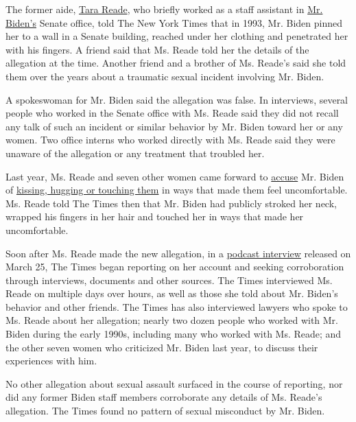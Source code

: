 The former aide,
\href{https://www.nytimes3xbfgragh.onion/2020/05/21/us/politics/tara-reade-credentials.html}{Tara
Reade}, who briefly worked as a staff assistant in
\href{https://www.nytimes3xbfgragh.onion/2020/04/16/technology/joe-biden-internet.html}{Mr.
Biden's} Senate office, told The New York Times that in 1993, Mr. Biden
pinned her to a wall in a Senate building, reached under her clothing
and penetrated her with his fingers. A friend said that Ms. Reade told
her the details of the allegation at the time. Another friend and a
brother of Ms. Reade's said she told them over the years about a
traumatic sexual incident involving Mr. Biden.

A spokeswoman for Mr. Biden said the allegation was false. In
interviews, several people who worked in the Senate office with Ms.
Reade said they did not recall any talk of such an incident or similar
behavior by Mr. Biden toward her or any women. Two office interns who
worked directly with Ms. Reade said they were unaware of the allegation
or any treatment that troubled her.

Last year, Ms. Reade and seven other women came forward to
\href{https://www.nytimes3xbfgragh.onion/2019/03/31/us/politics/joe-biden-flores.html}{accuse}
Mr. Biden of
\href{https://www.nytimes3xbfgragh.onion/2019/04/02/us/politics/joe-biden-women-me-too.html}{kissing,
hugging or touching them} in ways that made them feel uncomfortable. Ms.
Reade told The Times then that Mr. Biden had publicly stroked her neck,
wrapped his fingers in her hair and touched her in ways that made her
uncomfortable.

Soon after Ms. Reade made the new allegation, in a
\href{https://soundcloud.com/katie-halper/joe-bidens-accuser-finally-tells-her-full-story}{podcast
interview} released on March 25, The Times began reporting on her
account and seeking corroboration through interviews, documents and
other sources. The Times interviewed Ms. Reade on multiple days over
hours, as well as those she told about Mr. Biden's behavior and other
friends. The Times has also interviewed lawyers who spoke to Ms. Reade
about her allegation; nearly two dozen people who worked with Mr. Biden
during the early 1990s, including many who worked with Ms. Reade; and
the other seven women who criticized Mr. Biden last year, to discuss
their experiences with him.

No other allegation about sexual assault surfaced in the course of
reporting, nor did any former Biden staff members corroborate any
details of Ms. Reade's allegation. The Times found no pattern of sexual
misconduct by Mr. Biden.

